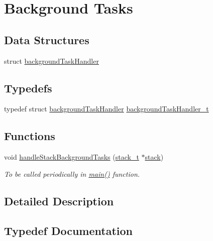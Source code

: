\hypertarget{group__background}{}\section{Background Tasks}
\label{group__background}
\subsection*{Data Structures}
\begin{DoxyCompactItemize}
\item 
struct \mbox{\hyperlink{structbackground_task_handler}{background\+Task\+Handler}}
\end{DoxyCompactItemize}
\subsection*{Typedefs}
\begin{DoxyCompactItemize}
\item 
typedef struct \mbox{\hyperlink{structbackground_task_handler}{background\+Task\+Handler}} \mbox{\hyperlink{group__background_gac2e383293fae75d74beedf63afefe604}{background\+Task\+Handler\+\_\+t}}
\end{DoxyCompactItemize}
\subsection*{Functions}
\begin{DoxyCompactItemize}
\item 
void \mbox{\hyperlink{group__background_gaf6bebfbbcd06181803783d2504fe318e}{handle\+Stack\+Background\+Tasks}} (\mbox{\hyperlink{group__stack_ga575defe06cb6cd9e4b02d90a916721b3}{stack\+\_\+t}} $\ast$\mbox{\hyperlink{structstack}{stack}})
\begin{DoxyCompactList}\small\item\em To be called periodically in \mbox{\hyperlink{main_8c_acdef7a1fd863a6d3770c1268cb06add3}{main()}} function. \end{DoxyCompactList}\end{DoxyCompactItemize}


\subsection{Detailed Description}


\subsection{Typedef Documentation}
\mbox{\label{group__background_gac2e383293fae75d74beedf63afefe604}} 
